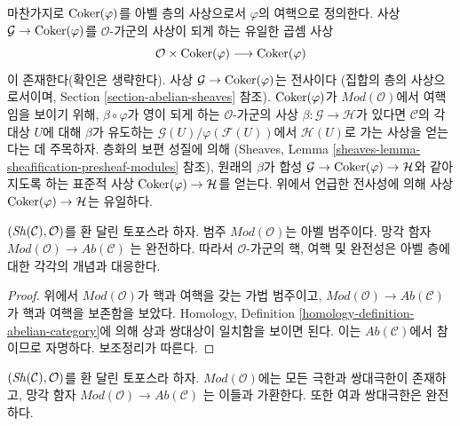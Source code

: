 \medskip\noindent
마찬가지로 $\mathop{\mathrm{Coker}}(\varphi)$를 아벨 층의 사상으로서 $\varphi$의
여핵으로 정의한다. 사상 $\mathcal{G} \to \mathop{\mathrm{Coker}}(\varphi)$를
$\mathcal{O}$-가군의 사상이 되게 하는 유일한 곱셈 사상
$$
\mathcal{O} \times \mathop{\mathrm{Coker}}(\varphi) \longrightarrow \mathop{\mathrm{Coker}}(\varphi)
$$
이 존재한다(확인은 생략한다).
사상 $\mathcal{G} \to \mathop{\mathrm{Coker}}(\varphi)$는 전사이다
(집합의 층의 사상으로서이며, Section \ref{section-abelian-sheaves} 참조).
$\mathop{\mathrm{Coker}}(\varphi)$가 $\textit{Mod}(\mathcal{O})$에서 여핵임을 보이기 위해,
$\beta \circ \varphi$가 영이 되게 하는 $\mathcal{O}$-가군의 사상
$\beta : \mathcal{G} \to \mathcal{H}$가 있다면 $\mathcal{C}$의 각 대상
$U$에 대해 $\beta$가 유도하는
$\mathcal{G}(U)/\varphi(\mathcal{F}(U))$에서 $\mathcal{H}(U)$로 가는
사상을 얻는다는 데 주목하자. 층화의 보편 성질에 의해
(Sheaves, Lemma \ref{sheaves-lemma-sheafification-presheaf-modules} 참조),
원래의 $\beta$가 합성
$\mathcal{G} \to \mathop{\mathrm{Coker}}(\varphi) \to \mathcal{H}$와 같아지도록 하는
표준적 사상 $\mathop{\mathrm{Coker}}(\varphi) \to \mathcal{H}$를 얻는다.
위에서 언급한 전사성에 의해 사상
$\mathop{\mathrm{Coker}}(\varphi) \to \mathcal{H}$는 유일하다.

\begin{lemma}
\label{lemma-abelian}
$(\mathop{\mathit{Sh}}\nolimits(\mathcal{C}), \mathcal{O})$를 환 달린 토포스라 하자.
범주 $\textit{Mod}(\mathcal{O})$는 아벨 범주이다. 망각 함자
$\textit{Mod}(\mathcal{O}) \to \textit{Ab}(\mathcal{C})$
는 완전하다. 따라서 $\mathcal{O}$-가군의 핵, 여핵 및 완전성은
아벨 층에 대한 각각의 개념과 대응한다.
\end{lemma}

\begin{proof}
위에서 $\textit{Mod}(\mathcal{O})$가 핵과 여핵을 갖는 가법 범주이고,
$\textit{Mod}(\mathcal{O}) \to \textit{Ab}(\mathcal{C})$가 핵과 여핵을
보존함을 보았다. Homology, Definition
\ref{homology-definition-abelian-category}에 의해 상과 쌍대상이 일치함을
보이면 된다. 이는 $\textit{Ab}(\mathcal{C})$에서 참이므로 자명하다.
보조정리가 따른다.
\end{proof}

\begin{lemma}
\label{lemma-limits-colimits}
$(\mathop{\mathit{Sh}}\nolimits(\mathcal{C}), \mathcal{O})$를 환 달린 토포스라 하자.
$\textit{Mod}(\mathcal{O})$에는 모든 극한과 쌍대극한이 존재하고, 망각 함자
$\textit{Mod}(\mathcal{O}) \to \textit{Ab}(\mathcal{C})$
는 이들과 가환한다. 또한 여과 쌍대극한은 완전하다.
\end{lemma}

